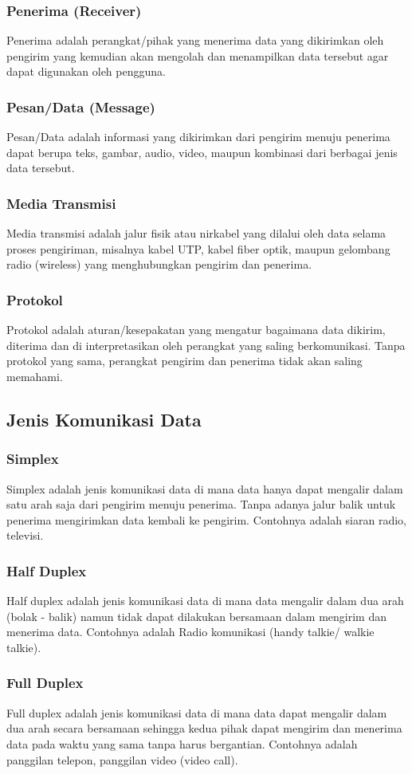 \subsubsection{Penerima (Receiver)}
Penerima adalah perangkat/pihak yang menerima data yang dikirimkan oleh pengirim yang kemudian akan mengolah dan menampilkan data tersebut agar dapat digunakan oleh pengguna.
\subsubsection{Pesan/Data (Message)}
Pesan/Data adalah informasi yang dikirimkan dari pengirim menuju penerima dapat berupa teks, gambar, audio, video, maupun kombinasi dari berbagai jenis data tersebut.
\subsubsection{Media Transmisi}
Media transmisi adalah jalur fisik atau nirkabel yang dilalui oleh data selama proses pengiriman, misalnya kabel UTP, kabel fiber optik, maupun gelombang radio (wireless) yang menghubungkan pengirim dan penerima.
\subsubsection{Protokol}
Protokol adalah aturan/kesepakatan yang mengatur bagaimana data dikirim, diterima dan di interpretasikan oleh perangkat yang saling berkomunikasi. Tanpa protokol yang sama, perangkat pengirim dan penerima tidak akan saling memahami.

\subsection{Jenis Komunikasi Data}
\subsubsection{Simplex}
Simplex adalah jenis komunikasi data di mana data hanya dapat mengalir dalam satu arah saja dari pengirim menuju penerima. Tanpa adanya jalur balik untuk penerima mengirimkan data kembali ke pengirim. Contohnya adalah siaran radio, televisi.
\subsubsection{Half Duplex}
Half duplex adalah jenis komunikasi data di mana data mengalir dalam dua arah (bolak - balik) namun tidak dapat dilakukan bersamaan dalam mengirim dan menerima data. Contohnya adalah Radio komunikasi (handy talkie/ walkie talkie).
\subsubsection{Full Duplex}
Full duplex adalah jenis komunikasi data di mana data dapat mengalir dalam dua arah secara bersamaan sehingga kedua pihak dapat mengirim dan menerima data pada waktu yang sama tanpa harus bergantian. Contohnya adalah panggilan telepon, panggilan video (video call).
